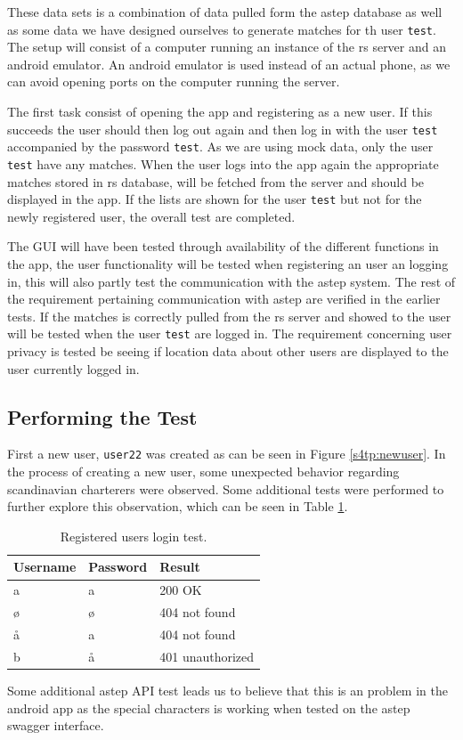 These data sets is a combination of data pulled form the \gls{astep} database as well as some data we have designed ourselves to generate matches for th user \texttt{test}.
The setup will consist of a computer running an instance of the \gls{rs} server and an android emulator.
An android emulator is used instead of an actual phone, as we can avoid opening ports on the computer running the server.

The first task consist of opening the app and registering as a new user. If this succeeds the user should then log out again and then log in with the user \texttt{test} accompanied by the password \texttt{test}.
As we are using mock data, only the user \texttt{test} have any matches.
When the user logs into the app again the appropriate matches stored in \gls{rs} database, will be fetched from the server and should be displayed in the app.
If the lists are shown for the user \texttt{test} but not for the newly registered user, the overall test are completed. 

The GUI will have been tested through availability of the different functions in the app, the user functionality will be tested when registering an user an logging in, this will also partly test the communication with the \gls{astep} system.
The rest of the requirement pertaining communication with \gls{astep} are verified in the earlier tests.
If the matches is correctly pulled from the \gls{rs} server and showed to the user will be tested when the user \texttt{test} are logged in.
The requirement concerning user privacy is tested be seeing if location data about other users are displayed to the user currently logged in. 


\subsection{Performing the Test}
First a new user, \texttt{user22} was created as can be seen in Figure \ref{s4tp:newuser}.
In the process of creating a new user, some unexpected behavior regarding scandinavian charterers were observed.
Some additional tests were performed to further explore this observation, which can be seen in Table \ref{tab:logintest}.
\begin{table}[!ht]
	\centering
	\begin{tabular}{@{}lll@{}}
		Username & Password & Result \\
		\hline
		a & a & 200 OK\\
		ø & ø & 404 not found\\
		å & a & 404 not found\\
		b & å & 401 unauthorized\\
	\end{tabular}
	\caption{Registered users login test.}
	\label{tab:logintest}
\end{table}
Some additional \gls{astep} API test leads us to believe that this is an problem in the android app as the special characters is working when tested on the \gls{astep} swagger interface.

